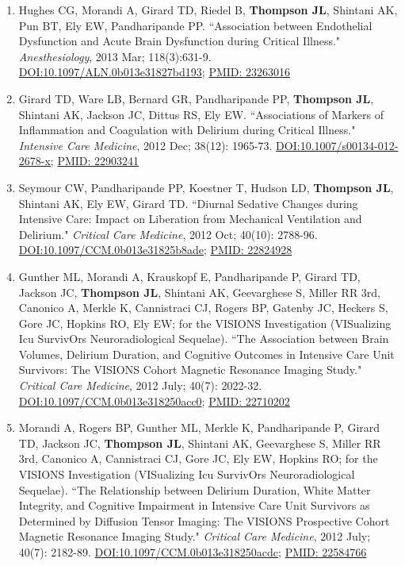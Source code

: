 \documentclass[5pt]{article}
\begin{document}
\begin{enumerate}
\item Hughes CG, Morandi A, Girard TD, Riedel B, \textbf{Thompson JL}, Shintani AK, Pun BT, Ely EW, Pandharipande PP. ``Association between Endothelial Dysfunction and Acute Brain Dysfunction during Critical Illness." \emph{Anesthesiology}, 2013 Mar; 118(3):631-9. \href{https://doi.org/10.1097/ALN.0b013e31827bd193}{DOI:10.1097/ALN.0b013e31827bd193}; \href{https://www.ncbi.nlm.nih.gov/pubmed/23263016}{PMID: 23263016}
\item Girard TD, Ware LB, Bernard GR, Pandharipande PP, \textbf{Thompson JL}, Shintani AK, Jackson JC, Dittus RS, Ely EW. ``Associations of Markers of Inflammation and Coagulation with Delirium during Critical Illness." \emph{Intensive Care Medicine}, 2012 Dec; 38(12): 1965-73. \href{https://doi.org/10.1007/s00134-012-2678-x}{DOI:10.1007/s00134-012-2678-x}; \href{https://www.ncbi.nlm.nih.gov/pubmed/22903241}{PMID: 22903241}
\item Seymour CW, Pandharipande PP, Koestner T, Hudson LD, \textbf{Thompson JL}, Shintani AK, Ely EW, Girard TD. ``Diurnal Sedative Changes during Intensive Care: Impact on Liberation from Mechanical Ventilation and Delirium." \emph{Critical Care Medicine}, 2012 Oct; 40(10): 2788-96.\\ \href{https://doi.org/10.1097/CCM.0b013e31825b8ade}{DOI:10.1097/CCM.0b013e31825b8ade}; \href{https://www.ncbi.nlm.nih.gov/pubmed/22824928}{PMID: 22824928}
\item Gunther ML, Morandi A, Krauskopf E, Pandharipande P, Girard TD, Jackson JC, \textbf{Thompson JL}, Shintani AK, Geevarghese S, Miller RR 3rd, Canonico A, Merkle K, Cannistraci CJ, Rogers BP, Gatenby JC, Heckers S, Gore JC, Hopkins RO, Ely EW; for the VISIONS Investigation (VISualizing Icu SurvivOrs Neuroradiological Sequelae). ``The Association between Brain Volumes, Delirium Duration, and Cognitive Outcomes in Intensive Care Unit Survivors: The VISIONS Cohort Magnetic Resonance Imaging Study." \emph{Critical Care Medicine}, 2012 July; 40(7): 2022-32. \href{https://doi.org/10.1097/CCM.0b013e318250acc0}{DOI:10.1097/CCM.0b013e318250acc0}; \href{https://www.ncbi.nlm.nih.gov/pubmed/22710202}{PMID: 22710202}
\item Morandi A, Rogers BP, Gunther ML, Merkle K, Pandharipande P, Girard TD, Jackson JC, \textbf{Thompson JL}, Shintani AK, Geevarghese S, Miller RR 3rd, Canonico A, Cannistraci CJ, Gore JC, Ely EW, Hopkins RO; for the VISIONS Investigation (VISualizing Icu SurvivOrs Neuroradiological Sequelae). ``The Relationship between Delirium Duration, White Matter Integrity, and Cognitive Impairment in Intensive Care Unit Survivors as Determined by Diffusion Tensor Imaging: The VISIONS Prospective Cohort Magnetic Resonance Imaging Study." \emph{Critical Care Medicine}, 2012 July; 40(7): 2182-89. \href{https://doi.org/10.1097/CCM.0b013e318250acdc}{DOI:10.1097/CCM.0b013e318250acdc}; \href{https://www.ncbi.nlm.nih.gov/pubmed/22584766}{PMID: 22584766}

\end{enumerate}
\end{document}
